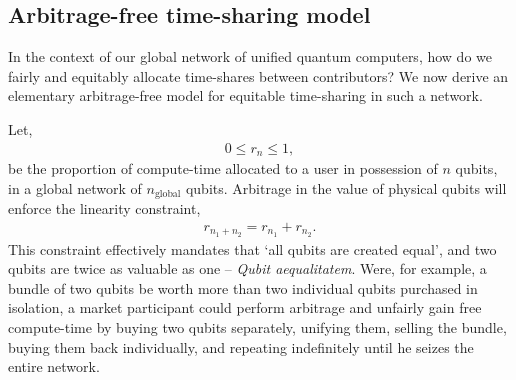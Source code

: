 \documentclass[aps, rmp, twocolumn, amsmath, amssymb, nofootinbib, superscriptaddress, longbibliography, floatfix, table-of-contents, eqsecnum]{revtex4-1}
\begin{document}
%
%

\subsection{Arbitrage-free time-sharing model}

In the context of our global network of unified quantum computers, how do we fairly and equitably allocate time-shares between contributors? We now derive an elementary arbitrage-free model for equitable time-sharing in such a network.

Let,
\begin{align}
	0\leq r_n \leq 1,
\end{align}
be the proportion of compute-time allocated to a user in possession of $n$ qubits, in a global network of $n_\text{global}$ qubits. Arbitrage in the value of physical qubits will enforce the linearity constraint,
\begin{align}
	r_{n_1+n_2} = r_{n_1} + r_{n_2}.
\end{align}
This constraint effectively mandates that `all qubits are created equal', and two qubits are twice as valuable as one -- \textit{Qubit aequalitatem}. Were, for example, a bundle of two qubits be worth more than two individual qubits purchased in isolation, a market participant could perform arbitrage and unfairly gain free compute-time by buying two qubits separately, unifying them, selling the bundle, buying them back individually, and repeating indefinitely until he seizes the entire network.
\end{document}
